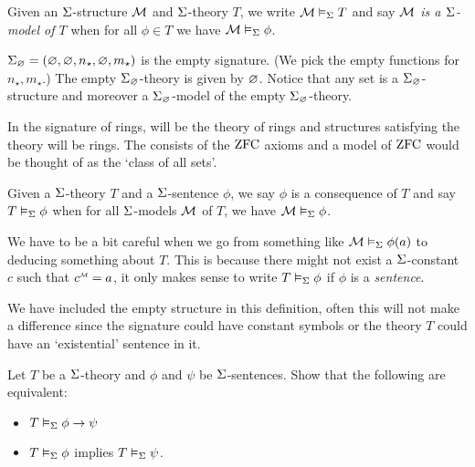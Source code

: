 \begin{dfn}[Models] 
    Given an $\Sigma$-structure $\mathcal{M}$ and $\Sigma$-theory $T$, 
    we write $\mathcal{M} \vDash_{\Sigma} T$ and say
    \emph{$\mathcal{M}$ is a $\Sigma$-model of $T$} when 
    for all $\phi \in T$ we have $\mathcal{M} \vDash_{\Sigma} \phi$.
\end{dfn}

\begin{eg}
    $\Sigma_\varnothing = (\varnothing, \varnothing, n_\star, \varnothing, m_\star)$ 
    is the empty signature.
    (We pick the empty functions for $n_\star, m_\star$.)
    The empty $\Sigma_\varnothing$-theory is given by $\varnothing$.
    Notice that any set is a $\Sigma_\varnothing$-structure and moreover
    a $\Sigma_\varnothing$-model of the empty $\Sigma_\varnothing$-theory.
\end{eg}

\begin{eg}
    In the signature of rings, 
     will be the theory
    of rings and structures satisfying the theory will be rings.
    The  %
    consists of the $\operatorname{ZFC}$ axioms and a model of $\operatorname{ZFC}$ would be thought of as 
    the `class of all sets'.
\end{eg}

\begin{dfn}[Consequence]
    Given a $\Sigma$-theory $T$ 
    and a $\Sigma$-sentence $\phi$,
    we say $\phi$ is a consequence of $T$
    and say $T \vDash_{\Sigma} \phi$ 
    when for all $\Sigma$-models $\mathcal{M}$ of $T$, 
    we have $\mathcal{M} \vDash_{\Sigma} \phi$.
\end{dfn}
\begin{rmk}
    We have to be a bit careful when we go from something like
    $\mathcal{M} \vDash_{\Sigma} \phi(a)$ to deducing something about $T$.
    This is because there might not exist a $\Sigma$-constant $c$ 
    such that $\modintp{\MM}{c} = a$,
    it only makes sense to write $T \vDash_{\Sigma} \phi$ if $\phi$
    is a \emph{sentence}.

    We have included the empty structure in this definition,
    often this will not make a difference since the signature 
    could have constant symbols or the theory $T$ could have an `existential' 
    sentence in it.
\end{rmk}

\begin{ex}
    Let $T$ be a $\Sigma$-theory and $\phi$ and $\psi$ be $\Sigma$-sentences.
    Show that the following are equivalent:
    \begin{itemize}
        \item $T \vDash_{\Sigma} \phi \to \psi$
        \item $T \vDash_{\Sigma} \phi$ implies $T \vDash_{\Sigma} \psi$.
    \end{itemize}
\end{ex}

